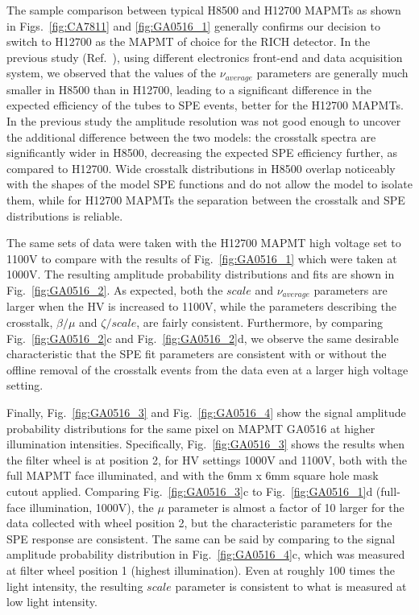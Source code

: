 The sample comparison between typical H8500 and H12700 MAPMTs as shown in Figs.~\ref{fig:CA7811} and \ref{fig:GA0516_1} generally confirms our decision to switch to H12700 as the MAPMT of choice for the RICH detector. In the previous study (Ref.~\cite{DEGTIARENKO20171}), using different electronics front-end and data acquisition system, we observed that the values of the $\nu_{average}$ parameters are generally much smaller in H8500 than in H12700, leading to a significant difference in the expected efficiency of the tubes to SPE events, better for the H12700 MAPMTs. In the previous study the amplitude resolution was not good enough to uncover the additional difference between the two models: the crosstalk spectra are significantly wider in H8500, decreasing the expected SPE efficiency further, as compared to H12700. Wide crosstalk distributions in H8500 overlap noticeably with the shapes of the model SPE functions and do not allow the model to isolate them, while for H12700 MAPMTs the separation between the crosstalk and SPE distributions is reliable.  

The same sets of data were taken with the H12700 MAPMT high voltage set to 1100V to compare with the results of Fig.~\ref{fig:GA0516_1} which were taken at 1000V. 
The resulting amplitude probability distributions and fits are shown in Fig.~\ref{fig:GA0516_2}. 
As expected, both the $scale$ and $\nu_{average}$ parameters are larger when the HV is increased to 1100V, while the parameters describing the crosstalk, $\beta/\mu$ and $\zeta/scale$, are fairly consistent. 
Furthermore, by comparing Fig.~\ref{fig:GA0516_2}c and Fig.~\ref{fig:GA0516_2}d, we observe the same desirable characteristic that the SPE fit parameters are consistent with or without the offline removal of the crosstalk events from the data even at a larger high voltage setting.


Finally, Fig.~\ref{fig:GA0516_3} and Fig.~\ref{fig:GA0516_4} show the signal amplitude probability distributions for the same pixel on MAPMT GA0516 at higher illumination intensities. 
Specifically, Fig.~\ref{fig:GA0516_3} shows the results when the filter wheel is at position 2, for HV settings 1000V and 1100V, both with the full MAPMT face illuminated, and with the 6mm x 6mm square hole mask cutout applied. 
Comparing Fig.~\ref{fig:GA0516_3}c to Fig.~\ref{fig:GA0516_1}d (full-face illumination, 1000V), the $\mu$ parameter is almost a factor of 10 larger for the data collected with wheel position 2, but the characteristic parameters for the SPE response are consistent. 
The same can be said by comparing to the signal amplitude probability distribution in Fig.~\ref{fig:GA0516_4}c, which was measured at filter wheel position 1 (highest illumination). 
Even at roughly 100 times the light intensity, the resulting $scale$ parameter is consistent to what is measured at low light intensity. 


